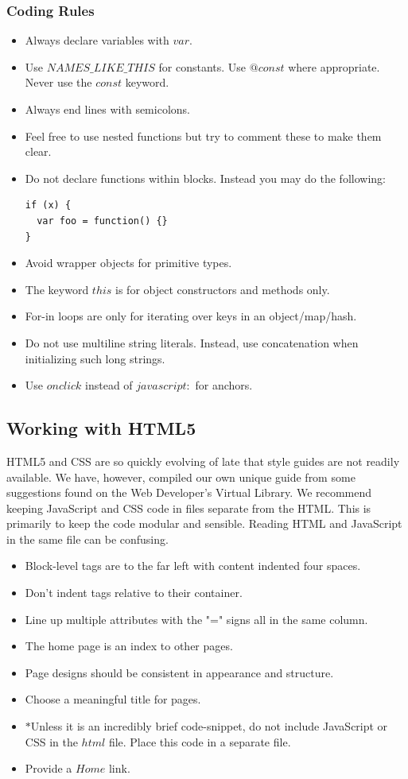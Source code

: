 \documentclass[12pt]{article}
\begin{document}
\subsubsection{Coding Rules}
\begin{itemize}
\item Always declare variables with $var$.
\item Use $NAMES\_LIKE\_THIS$ for constants. Use $@const$ where appropriate. Never use the $const$ keyword. 
\item Always end lines with semicolons.
\item Feel free to use nested functions but try to comment these to make them clear.
\item Do not declare functions within blocks.  Instead you may do the following:
\begin{verbatim}
if (x) {
  var foo = function() {}
}
\end{verbatim}
\item Avoid wrapper objects for primitive types.
\item The keyword $this$ is for object constructors and methods only.
\item For-in loops are only for iterating over keys in an object/map/hash.
\item Do not use multiline string literals.  Instead, use concatenation when initializing such long strings.
\item Use $onclick$ instead of $javascript:$ for anchors.
\end{itemize}

\subsection{Working with HTML5}
HTML5 and CSS are so quickly evolving of late that style guides are not readily available.  We have, however, compiled our own unique guide from some suggestions found on the Web Developer's Virtual Library\cite{HTMLStyle-WDVL}.  We recommend keeping JavaScript and CSS code in files separate from the HTML.  This is primarily to keep the code modular and sensible.  Reading HTML and JavaScript in the same file can be confusing.

\begin{itemize}
\item Block-level tags are to the far left with content indented four spaces.
\item Don't indent tags relative to their container.
\item Line up multiple attributes with the "=" signs all in the same column.
\item The home page is an index to other pages.
\item Page designs should be consistent in appearance and structure.
\item Choose a meaningful title for pages.
\item $*$Unless it is an incredibly brief code-snippet, do not include JavaScript or CSS in the $html$ file.  Place this code in a separate file.
\item Provide a $Home$ link.
\end{itemize}
\end{document}
